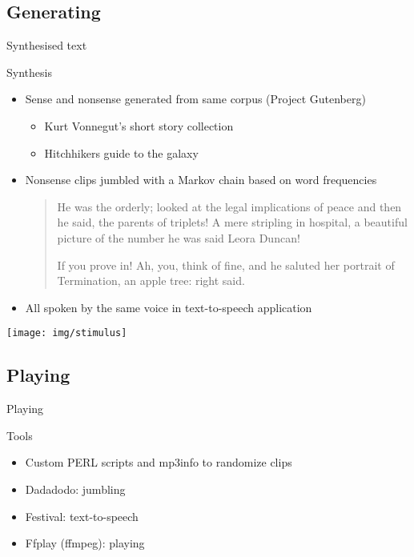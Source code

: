 \subsection{Generating}
\begin{frame}{Synthesised text}
    \begin{block}{Synthesis } \begin{itemize}
       \item Sense and nonsense generated from same corpus (Project Gutenberg)
		\begin{itemize} 
			\item Kurt Vonnegut's short story collection
			\item Hitchhikers guide to the galaxy
		\end{itemize}
	\item Nonsense clips jumbled with a Markov chain based on word frequencies
	    \begin{small}\begin{quote}
	    He was the orderly; looked at the legal implications of
	    peace and then he said, the parents of triplets!  A mere
	    stripling in hospital, a beautiful picture of the number he
	    was said Leora Duncan! 

	    If you prove in!  Ah, you, think of fine, and he saluted
	    her portrait of Termination, an apple tree: right said.
	    \end{quote}\end{small}
	\item All spoken by the same voice in text-to-speech application
    \end{itemize} \end{block}
\end{frame}
\begin{frame}
\texttt{[image: img/stimulus]}
\end{frame}

\subsection{Playing}
\begin{frame}{ Playing}
    \begin{block}{Tools} \begin{itemize}
	\item  Custom PERL scripts and mp3info to randomize clips
	\item  Dadadodo: jumbling 
	\item  Festival: text-to-speech
	\item  Ffplay (ffmpeg): playing
    \end{itemize} \end{block}
\end{frame}

